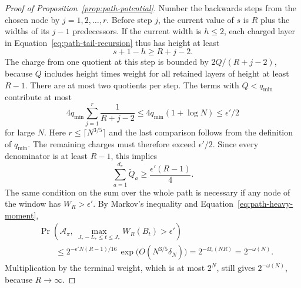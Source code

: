 \begin{proof}[Proof of Proposition~\ref{prop:path-potential}]
Number the backwards steps from the chosen node by \(j=1,2,\ldots,r\).
Before step \(j\), the current value of \(s\) is \(R\) plus the widths
of its \(j-1\) predecessors. If the current width is \(h\le2\), each
charged layer in Equation~\eqref{eq:path-tail-recursion} thus has
height at least
\[
 s+1-h\ge R+j-2.
\]
The charge from one quotient at this step is bounded by
\(2Q/(R+j-2)\), because \(Q\) includes height times weight for all
retained layers of height at least \(R-1\). There are at most two
quotients per step. The terms with \(Q<q_{\min}\) contribute at most
\[
 4q_{\min}\sum_{j=1}^{r}\frac1{R+j-2}
 \le4q_{\min}(1+\log N)\le\epsilon'/2
\]
for large \(N\). Here \(r\le\lceil N^{3/5}\rceil\) and the last
comparison follows from the definition of \(q_{\min}\).
The remaining charges must therefore exceed \(\epsilon'/2\).
Since every denominator is at least \(R-1\), this implies
\[
 \sum_{a=1}^{d_\pi}\widetilde Q_a
       \ge\frac{\epsilon'(R-1)}4.
\]
The same condition on the sum over the whole path is necessary if
any node of the window has \(W_R>\epsilon'\). By Markov's inequality
and Equation~\eqref{eq:path-heavy-moment},
\begin{equation}\label{eq:path-large-tail}
 \begin{split}
 &\Pr\!\left(\mathcal A_\pi,\
       \max_{J_*-L_*\le t\le J_*}W_R(B_t)>\epsilon'\right)\\
 &\qquad\le
 2^{-\epsilon'N(R-1)/16}\,
      \exp\!\bigl(O(N^{3/5}\delta_N)\bigr)
 =2^{-\Omega_\epsilon(NR)}=2^{-\omega(N)}.
 \end{split}
\end{equation}
Multiplication by the terminal weight, which is at most \(2^N\),
still gives \(2^{-\omega(N)}\), because \(R\to\infty\).


\end{proof}
